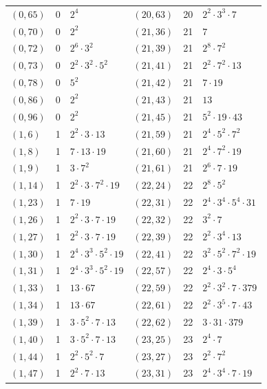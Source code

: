 \documentclass[11pt]{article}
\begin{document}
\begin{longtable}{@{}lrl@{\qquad}lrl@{}}
$(0,65)$ & 0 & $2^{4}$ & $(20,63)$ & 20 & $2^{2}\cdot 3^{3}\cdot 7$\\
$(0,70)$ & 0 & $2^{2}$ & $(21,36)$ & 21 & $7$\\
$(0,72)$ & 0 & $2^{6}\cdot 3^{2}$ & $(21,39)$ & 21 & $2^{8}\cdot 7^{2}$\\
$(0,73)$ & 0 & $2^{2}\cdot 3^{2}\cdot 5^{2}$ & $(21,41)$ & 21 & $2^{2}\cdot 7^{2}\cdot 13$\\
$(0,78)$ & 0 & $5^{2}$ & $(21,42)$ & 21 & $7\cdot 19$\\
$(0,86)$ & 0 & $2^{2}$ & $(21,43)$ & 21 & $13$\\
$(0,96)$ & 0 & $2^{2}$ & $(21,45)$ & 21 & $5^{2}\cdot 19\cdot 43$\\
$(1,6)$ & 1 & $2^{2}\cdot 3\cdot 13$ & $(21,59)$ & 21 & $2^{4}\cdot 5^{2}\cdot 7^{2}$\\
$(1,8)$ & 1 & $7\cdot 13\cdot 19$ & $(21,60)$ & 21 & $2^{4}\cdot 7^{2}\cdot 19$\\
$(1,9)$ & 1 & $3\cdot 7^{2}$ & $(21,61)$ & 21 & $2^{6}\cdot 7\cdot 19$\\
$(1,14)$ & 1 & $2^{2}\cdot 3\cdot 7^{2}\cdot 19$ & $(22,24)$ & 22 & $2^{8}\cdot 5^{2}$\\
$(1,23)$ & 1 & $7\cdot 19$ & $(22,31)$ & 22 & $2^{4}\cdot 3^{4}\cdot 5^{4}\cdot 31$\\
$(1,26)$ & 1 & $2^{2}\cdot 3\cdot 7\cdot 19$ & $(22,32)$ & 22 & $3^{2}\cdot 7$\\
$(1,27)$ & 1 & $2^{2}\cdot 3\cdot 7\cdot 19$ & $(22,39)$ & 22 & $2^{2}\cdot 3^{4}\cdot 13$\\
$(1,30)$ & 1 & $2^{4}\cdot 3^{3}\cdot 5^{2}\cdot 19$ & $(22,41)$ & 22 & $3^{2}\cdot 5^{2}\cdot 7^{2}\cdot 19$\\
$(1,31)$ & 1 & $2^{4}\cdot 3^{3}\cdot 5^{2}\cdot 19$ & $(22,57)$ & 22 & $2^{4}\cdot 3\cdot 5^{4}$\\
$(1,33)$ & 1 & $13\cdot 67$ & $(22,59)$ & 22 & $2^{2}\cdot 3^{2}\cdot 7\cdot 379$\\
$(1,34)$ & 1 & $13\cdot 67$ & $(22,61)$ & 22 & $2^{2}\cdot 3^{5}\cdot 7\cdot 43$\\
$(1,39)$ & 1 & $3\cdot 5^{2}\cdot 7\cdot 13$ & $(22,62)$ & 22 & $3\cdot 31\cdot 379$\\
$(1,40)$ & 1 & $3\cdot 5^{2}\cdot 7\cdot 13$ & $(23,25)$ & 23 & $2^{4}\cdot 7$\\
$(1,44)$ & 1 & $2^{2}\cdot 5^{2}\cdot 7$ & $(23,27)$ & 23 & $2^{2}\cdot 7^{2}$\\
$(1,47)$ & 1 & $2^{2}\cdot 7\cdot 13$ & $(23,31)$ & 23 & $2^{4}\cdot 3^{4}\cdot 7\cdot 19$\\

\end{longtable}
\end{document}
